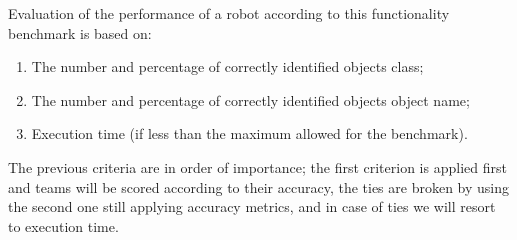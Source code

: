 Evaluation of the performance of a robot according to this functionality benchmark is based on:
%
\begin{enumerate}
\item The number and percentage of correctly identified objects class;
\item The number and percentage of correctly identified objects object name;
\item Execution time (if less than the maximum allowed for the benchmark).
\end{enumerate}
%
The previous criteria are in order of importance; the first criterion is applied first and teams will be scored according to their accuracy, the ties are broken by using the second one still applying accuracy metrics, and in case of ties we will resort to execution time.


